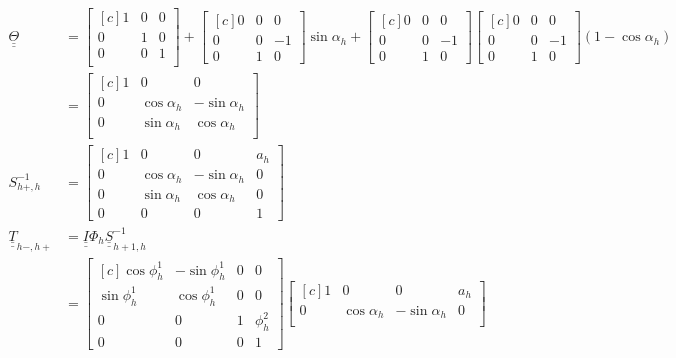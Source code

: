 \documentclass[onecolumn,10pt]{jhwhw}
\def\du#1{\underline{\underline{#1}}}
\begin{document}
\begin{align*}
\du{\Theta} &=
\begin{bmatrix*}[c]
1 & 0 & 0 \\
0 & 1 & 0 \\
0 & 0 & 1 \\
\end{bmatrix*} +
\begin{bmatrix*}[c]
0 & 0 & 0 \\
0 & 0 & -1 \\
0 & 1 & 0
\end{bmatrix*} \sin \alpha_h +
\begin{bmatrix*}[c]
0 & 0 & 0 \\
0 & 0 & -1 \\
0 & 1 & 0
\end{bmatrix*}
\begin{bmatrix*}[c]
0 & 0 & 0 \\
0 & 0 & -1 \\
0 & 1 & 0
\end{bmatrix*} \left ( 1 - \cos \alpha_h \right ) \\
&=
\begin{bmatrix*}[c]
1 &        0 &         0 \\
0 & \cos \alpha_h & -\sin \alpha_h \\
0 & \sin \alpha_h &  \cos \alpha_h \\
\end{bmatrix*} \\
S_{h+,h}^{-1} &=
\begin{bmatrix*}[c]
1 &        0 &         0  & a_h \\
0 & \cos \alpha_h & -\sin \alpha_h & 0 \\
0 & \sin \alpha_h &  \cos \alpha_h & 0\\
0 & 0 & 0 & 1
\end{bmatrix*} \\
\du{T}_{h-, h+} &= \du{I} \Phi_{h} \du{S}^{-1}_{h+1, h} \\
&=
\begin{bmatrix*}[c]
\cos \phi_h^1 & -\sin \phi_h^1 & 0 & 0 \\
\sin \phi_h^1 &  \cos \phi_h^1 & 0 & 0 \\
0 & 0 & 1 & \phi_h^2 \\
0 & 0 & 0 & 1
\end{bmatrix*}
\begin{bmatrix*}[c]
1 &        0 &         0  & a_h \\
0 & \cos \alpha_h & -\sin \alpha_h & 0 \\

\end{bmatrix*}
\end{align*}
\end{document}
